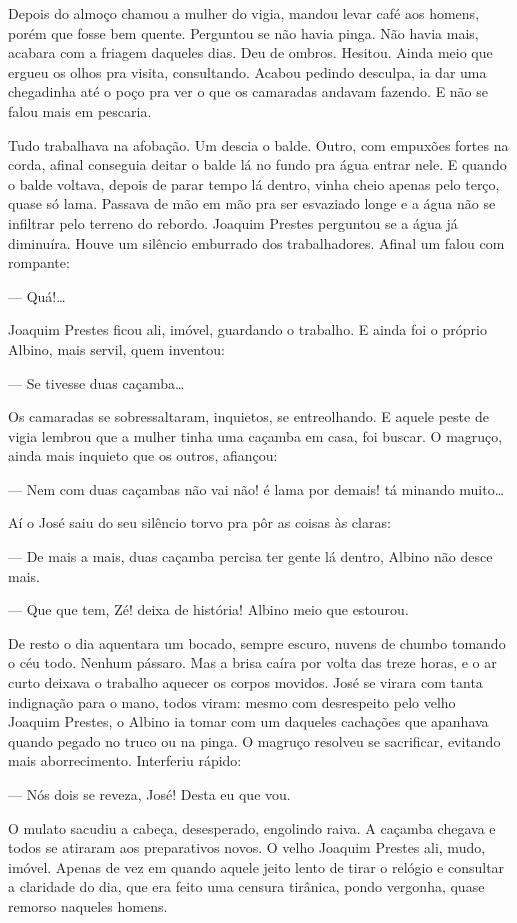 Depois do almoço chamou a mulher do vigia, mandou levar café aos homens,
porém que fosse bem quente. Perguntou se não havia pinga. Não havia
mais, acabara com a friagem daqueles dias. Deu de ombros. Hesitou. Ainda
meio que ergueu os olhos pra visita, consultando. Acabou pedindo
desculpa, ia dar uma chegadinha até o poço pra ver o que os camaradas
andavam fazendo. E não se falou mais em pescaria.

Tudo trabalhava na afobação. Um descia o balde. Outro, com empuxões
fortes na corda, afinal conseguia deitar o balde lá no fundo pra água
entrar nele. E quando o balde voltava, depois de parar tempo lá dentro,
vinha cheio apenas pelo terço, quase só lama. Passava de mão em mão pra
ser esvaziado longe e a água não se infiltrar pelo terreno do rebordo.
Joaquim Prestes perguntou se a água já diminuíra. Houve um silêncio
emburrado dos trabalhadores. Afinal um falou com rompante:

--- Quá!\ldots{}

Joaquim Prestes ficou ali, imóvel, guardando o trabalho. E ainda foi o
próprio Albino, mais servil, quem inventou:

--- Se tivesse duas caçamba\ldots{}

Os camaradas se sobressaltaram, inquietos, se entreolhando. E aquele
peste de vigia lembrou que a mulher tinha uma caçamba em casa, foi
buscar. O magruço, ainda mais inquieto que os outros, afiançou:

--- Nem com duas caçambas não vai não! é lama por demais! tá minando
muito\ldots{}

Aí o José saiu do seu silêncio torvo pra pôr as coisas às claras:

--- De mais a mais, duas caçamba percisa ter gente lá dentro, Albino não
desce mais.

--- Que que tem, Zé! deixa de história! Albino meio que estourou.

De resto o dia aquentara um bocado, sempre escuro, nuvens de chumbo
tomando o céu todo. Nenhum pássaro. Mas a brisa caíra por volta das
treze horas, e o ar curto deixava o trabalho aquecer os corpos movidos.
José se virara com tanta indignação para o mano, todos viram: mesmo com
desrespeito pelo velho Joaquim Prestes, o Albino ia tomar com um
daqueles cachações que apanhava quando pegado no truco ou na pinga. O
magruço resolveu se sacrificar, evitando mais aborrecimento. Interferiu
rápido:

--- Nós dois se reveza, José! Desta eu que vou.

O mulato sacudiu a cabeça, desesperado, engolindo raiva. A caçamba
chegava e todos se atiraram aos preparativos novos. O velho Joaquim
Prestes ali, mudo, imóvel. Apenas de vez em quando aquele jeito lento de
tirar o relógio e consultar a claridade do dia, que era feito uma
censura tirânica, pondo vergonha, quase remorso naqueles homens.

